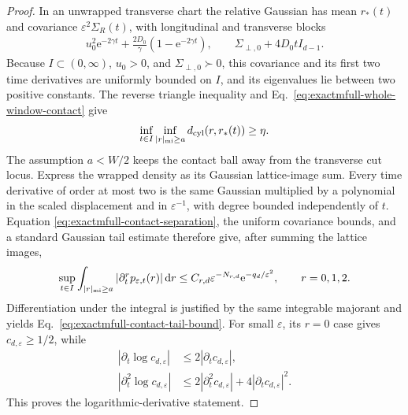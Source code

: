 \documentclass{iopjournal}
\newcommand{\dd}{\mathrm d}
\newcommand{\e}{\mathrm e}
\theoremstyle{plain}
\theoremstyle{definition}
\begin{document}
\begin{proof}
In an unwrapped transverse chart the relative Gaussian has mean \(r_*(t)\)
and covariance \(\varepsilon^2\Sigma_R(t)\), with longitudinal and transverse
blocks
\begin{align}
 u_0^2\e^{-2\gamma t}
 +\frac{2D_0}{\gamma}(1-\e^{-2\gamma t}),
 \qquad
 \Sigma_{\perp,0}+4D_0t I_{d-1}.
 \label{eq:exactmfull-relative-covariance}
\end{align}
Because \(I\subset(0,\infty)\), \(u_0>0\), and
\(\Sigma_{\perp,0}\succ0\), this covariance and its first two time
derivatives are uniformly bounded on \(I\), and its eigenvalues lie between
two positive constants.  The reverse triangle inequality and
Eq.~\eqref{eq:exactmfull-whole-window-contact} give
\begin{equation}
 \inf_{t\in I}\inf_{|r|_{\rm mi}\ge a}
 d_{\rm cyl}(r,r_*(t))\ge\eta.
 \label{eq:exactmfull-contact-separation}
\end{equation}
The assumption \(a<W/2\) keeps the contact ball away from the transverse cut
locus.  Express the wrapped density as its Gaussian lattice-image sum.
Every time derivative of order at most two is the same Gaussian multiplied
by a polynomial in the scaled displacement and in \(\varepsilon^{-1}\),
with degree bounded independently of \(t\).  Equation
\eqref{eq:exactmfull-contact-separation}, the uniform covariance bounds, and
a standard Gaussian tail estimate therefore give, after summing the lattice
images,
\begin{equation}
 \sup_{t\in I}\int_{|r|_{\rm mi}\ge a}
 |\partial_t^r p_{\varepsilon,t}(r)|\,\dd r
 \le C_{r,d}\varepsilon^{-N_{r,d}}
       \e^{-q_d/\varepsilon^2},
 \qquad r=0,1,2.
 \label{eq:exactmfull-density-tail}
\end{equation}
Differentiation under the integral is justified by the same integrable
majorant and yields Eq.~\eqref{eq:exactmfull-contact-tail-bound}.  For small
\(\varepsilon\), its \(r=0\) case gives \(c_{d,\varepsilon}\ge1/2\), while
\begin{align}
 |\partial_t\log c_{d,\varepsilon}|
 &\le2|\partial_t c_{d,\varepsilon}|,\nonumber\\
 |\partial_t^2\log c_{d,\varepsilon}|
 &\le2|\partial_t^2c_{d,\varepsilon}|
      +4|\partial_tc_{d,\varepsilon}|^2.
 \label{eq:exactmfull-log-contact-bounds}
\end{align}
This proves the logarithmic-derivative statement.
\end{proof}
\end{document}
